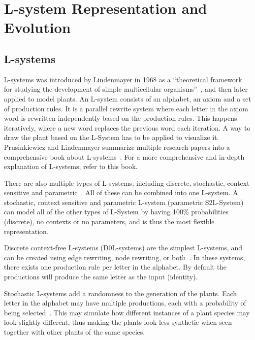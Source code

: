 \chapter{L-system Representation and Evolution}

\section{L-systems}
L-systems was introduced by Lindenmayer in 1968 as a ``theoretical framework for studying the development of simple multicellular organisms''~\cite{2012Prusinkiewicz}, and then later applied to model plants.
An L-system consists of an alphabet, an axiom and a set of production rules.
It is a parallel rewrite system where each letter in the axiom word is rewritten independently based on the production rules.
This happens iteratively, where a new word replaces the previous word each iteration.
A way to draw the plant based on the L-System has to be applied to visualize it.
Prusinkiewicz and Lindenmayer summarize multiple research papers into a comprehensive book about L-systems~\cite{2012Prusinkiewicz}.
For a more comprehensive and in-depth explanation of L-systems, refer to this book.

There are also multiple types of L-systems, including discrete, stochastic, context sensitive and parametric~\cite{2012Prusinkiewicz}.
All of these can be combined into one L-system.
A stochastic, context sensitive and parametric L-system (parametric S2L-System) can model all of the other types of L-System by having 100\% probabilities (discrete), no contexts or no parameters, and is thus the most flexible representation.

Discrete context-free L-systems (D0L-systems) are the simplest L-systems, and can be created using edge rewriting, node rewriting, or both~\cite{2012Prusinkiewicz}.
In these systems, there exists one production rule per letter in the alphabet.
By default the productions will produce the same letter as the input (identity).

Stochastic L-systems add a randomness to the generation of the plants.
Each letter in the alphabet may have multiple productions, each with a probability of being selected~\cite{2012Prusinkiewicz}.
This may simulate how different instances of a plant species may look slightly different, thus making the plants look less synthetic when seen together with other plants of the same species.


